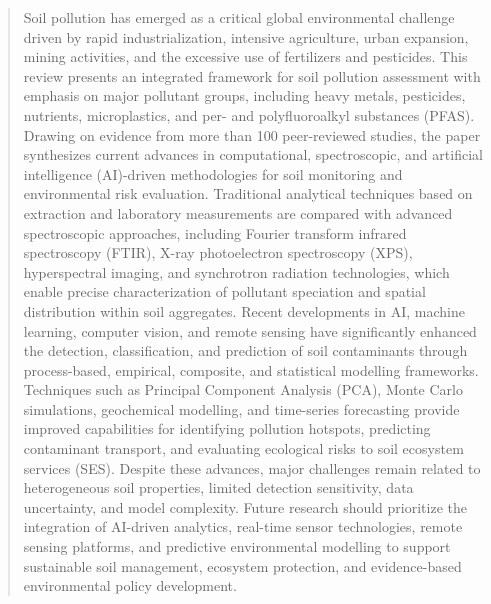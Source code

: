 \documentclass[preprint,12pt]{elsarticle}            %
\begin{document}
\begin{frontmatter}
\begin{abstract}
Soil pollution has emerged as a critical global environmental challenge driven
by rapid industrialization, intensive agriculture, urban expansion, mining
activities, and the excessive use of fertilizers and pesticides. This review
presents an integrated framework for soil pollution assessment with emphasis
on major pollutant groups, including heavy metals, pesticides, nutrients,
microplastics, and per- and polyfluoroalkyl substances (PFAS). Drawing on
evidence from more than 100 peer-reviewed studies, the paper synthesizes
current advances in computational, spectroscopic, and artificial intelligence
(AI)-driven methodologies for soil monitoring and environmental risk
evaluation. Traditional analytical techniques based on extraction and
laboratory measurements are compared with advanced spectroscopic approaches,
including Fourier transform infrared spectroscopy (FTIR), X-ray photoelectron
spectroscopy (XPS), hyperspectral imaging, and synchrotron radiation
technologies, which enable precise characterization of pollutant speciation
and spatial distribution within soil aggregates. Recent developments in AI,
machine learning, computer vision, and remote sensing have significantly
enhanced the detection, classification, and prediction of soil contaminants
through process-based, empirical, composite, and statistical modelling
frameworks. Techniques such as Principal Component Analysis (PCA), Monte
Carlo simulations, geochemical modelling, and time-series forecasting provide
improved capabilities for identifying pollution hotspots, predicting
contaminant transport, and evaluating ecological risks to soil ecosystem
services (SES). Despite these advances, major challenges remain related to
heterogeneous soil properties, limited detection sensitivity, data
uncertainty, and model complexity. Future research should prioritize the
integration of AI-driven analytics, real-time sensor technologies, remote
sensing platforms, and predictive environmental modelling to support
sustainable soil management, ecosystem protection, and evidence-based
environmental policy development.
\end{abstract}

\begin{graphicalabstract}
\end{graphicalabstract}


\end{frontmatter}
\end{document}
